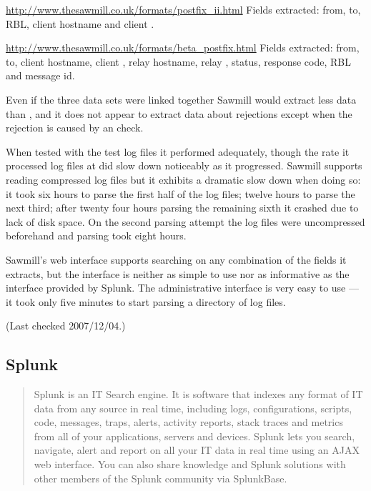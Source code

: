\url{http://www.thesawmill.co.uk/formats/postfix_ii.html} \newline Fields
extracted: from, to, RBL, client hostname and client \IP{}\@.

\url{http://www.thesawmill.co.uk/formats/beta_postfix.html} \newline Fields
extracted: from, to, client hostname, client \IP{}, relay hostname, relay
\IP{}, status, response code, RBL and message id.

Even if the three data sets were linked together Sawmill would extract less
data than \parsername{}, and it does not appear to extract data about
rejections except when the rejection is caused by an \DNSBL{} check.

When tested with the \numberOFlogFILES{} test log files it performed
adequately, though the rate it processed log files at did slow down
noticeably as it progressed.  Sawmill supports reading compressed log files
but it exhibits a dramatic slow down when doing so: it took six hours to
parse the first half of the log files; twelve hours to parse the next
third; after twenty four hours parsing the remaining sixth it crashed due
to lack of disk space.  On the second parsing attempt the log files were
uncompressed beforehand and parsing took eight hours.

Sawmill's web interface supports searching on any combination of the fields
it extracts, but the interface is neither as simple to use nor as
informative as the interface provided by Splunk.  The administrative
interface is very easy to use --- it took only five minutes to start
parsing a directory of log files.

(Last checked 2007/12/04.)

\subsection{Splunk}

\begin{quotation}

    Splunk is an IT Search engine. It is software that indexes any format
    of IT data from any source in real time, including logs,
    configurations, scripts, code, messages, traps, alerts, activity
    reports, stack traces and metrics from all of your applications,
    servers and devices. Splunk lets you search, navigate, alert and report
    on all your IT data in real time using an AJAX web interface. You can
    also share knowledge and Splunk solutions with other members of the
    Splunk community via SplunkBase.

\end{quotation}

